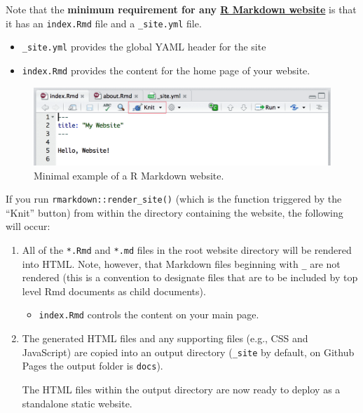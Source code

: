 \documentclass[
  a4paper,
  twoside,
  openright]{book}
\providecommand{\tightlist}{%
  \setlength{\itemsep}{0pt}\setlength{\parskip}{0pt}}
\theoremstyle{definition}
\theoremstyle{definition}
\theoremstyle{definition}
\theoremstyle{definition}
\theoremstyle{remark}
\begin{document}
Note that the \textbf{minimum requirement for any \href{https://bookdown.org/yihui/rmarkdown/rmarkdown-site.html}{R Markdown website}} is that it has an \texttt{index.Rmd} file and a \texttt{\_site.yml} file.

\begin{itemize}
\tightlist
\item
  \texttt{\_site.yml} provides the global YAML header for the site
\item
  \texttt{index.Rmd} provides the content for the home page of your website.
\end{itemize}

\begin{figure}
\includegraphics[width=16.69in]{images/site-page} \caption{Minimal example of a R Markdown website.}\label{fig:unnamed-chunk-1}
\end{figure}

If you run \texttt{rmarkdown::render\_site()} (which is the function triggered by the ``Knit'' button) from within the directory containing the website, the following will occur:

\begin{enumerate}
\def\labelenumi{\arabic{enumi}.}
\item
  All of the \texttt{*.Rmd} and \texttt{*.md} files in the root website directory will be rendered into HTML. Note, however, that Markdown files beginning with \texttt{\_} are not rendered (this is a convention to designate files that are to be included by top level Rmd documents as child documents).

  \begin{itemize}
  \tightlist
  \item
    \texttt{index.Rmd} controls the content on your main page.
  \end{itemize}
\item
  The generated HTML files and any supporting files (e.g., CSS and JavaScript) are copied into an output directory (\texttt{\_site} by default, on Github Pages the output folder is \texttt{docs}).

  The HTML files within the output directory are now ready to deploy as a standalone static website.
\end{enumerate}
\end{document}
